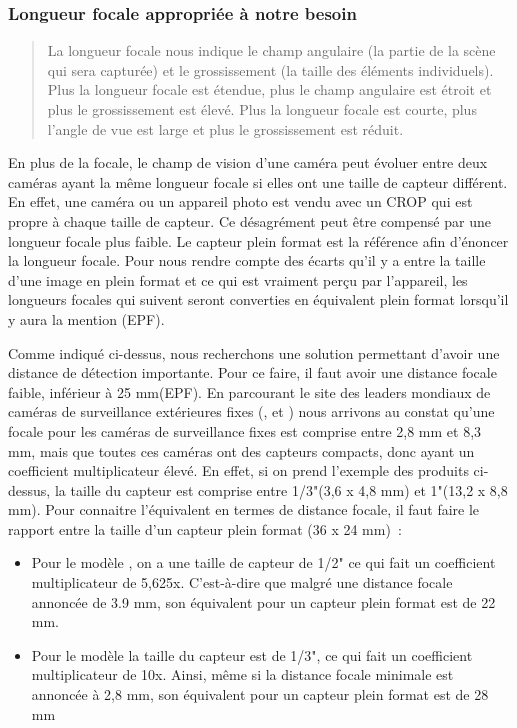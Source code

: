 \subsubsection{Longueur focale appropriée à notre besoin}
\label{sec:camera_focale}

\blockquote{La longueur focale nous indique le champ angulaire (la partie de la scène qui sera capturée)
    et le grossissement (la taille des éléments individuels).
    Plus la longueur focale est étendue, plus le champ angulaire est étroit et plus le grossissement est élevé.
    Plus la longueur focale est courte, plus l’angle de vue est large et plus le grossissement est réduit.\cite{focale}}

En plus de la focale, le champ de vision d'une caméra peut évoluer entre deux caméras ayant la même longueur focale
si elles ont une taille de capteur différent.
En effet, une caméra ou un appareil photo est vendu avec un \gls{CROP} qui est propre à chaque taille de capteur.
Ce désagrément peut être compensé par une longueur focale plus faible.
Le capteur plein format est la référence afin d'énoncer la longueur focale.
Pour nous rendre compte des écarts qu'il y a entre la taille d'une image en plein format et ce qui est vraiment perçu par l'appareil,
les longueurs focales qui suivent seront converties en équivalent plein format lorsqu'il y aura la mention (EPF).

Comme indiqué ci-dessus, nous recherchons une solution permettant d'avoir une distance de détection importante.
Pour ce faire, il faut avoir une distance focale faible, inférieur à 25 mm(EPF).
En parcourant le site des leaders mondiaux de caméras de surveillance extérieures fixes
(\cite{pelco}, \cite{axis} et \cite{panasonic})
nous arrivons au constat qu'une focale pour les caméras de surveillance fixes est comprise entre 2,8 mm et 8,3 mm, mais que toutes ces caméras ont des capteurs compacts, donc ayant un coefficient multiplicateur élevé.
En effet, si on prend l'exemple des produits ci-dessus, la taille du capteur est comprise entre 1/3"(3,6 x 4,8 mm) et 1"(13,2 x 8,8 mm).
Pour connaitre l'équivalent en termes de distance focale, il faut faire le rapport entre la taille d'un capteur plein format (36 x 24 mm) :
\begin{itemize}
    \item Pour le modèle \cite[AXIS Q1645]{axisQ1645}, on a une taille de capteur de 1/2"
          ce qui fait un coefficient multiplicateur de 5,625x. C'est-à-dire que malgré une distance focale annoncée de 3.9 mm, son équivalent pour un capteur plein format est de 22 mm.
    \item Pour le modèle \cite[Panasonic i-Pro Extreme WV-S1531LN - network surveillance camera]{panaIPro}
          la taille du capteur est de 1/3", ce qui fait un coefficient multiplicateur de 10x. Ainsi, même si la distance focale minimale est annoncée à 2,8 mm, son équivalent pour un capteur plein format est de 28 mm
\end{itemize}

